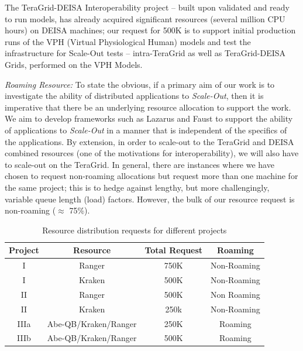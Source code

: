 \documentclass[a4paper,10pt]{article}
\begin{document}
The TeraGrid-DEISA Interoperability project -- built upon validated and ready to run models, has already acquired significant resources (several million CPU hours) on DEISA machines; our request for 500K is to support initial production runs of the VPH (Virtual Physiological Human) models and test the infrastructure for Scale-Out tests -- intra-TeraGrid as well as TeraGrid-DEISA Grids, performed on the VPH Models.

{\it Roaming Resource:} To state the obvious, if a primary aim of our work is to investigate the ability of distributed applications to {\it Scale-Out}, then it is imperative that there be an underlying resource allocation to support the work. We aim to develop frameworks such as Lazarus and Faust to support the ability of applications to {\it Scale-Out} in a manner that is independent of the specifics of the applications.  By extension, in order to scale-out to the TeraGrid and DEISA combined resources (one of the motivations for interoperability), we will also have to scale-out on the TeraGrid.  In general, there are instances where we have chosen to request non-roaming allocations but request more than one machine for the same project; this is to hedge against lengthy, but more challengingly, variable queue length (load) factors. However, 
the bulk of our resource request is non-roaming ($\approx$ 75\%).

\begin{table}[!h]
\begin{center}
  \caption{Resource distribution requests for different projects\newline}
\label{table:systems}
\begin{tabular}{|c| c | c | c | }
\hline 
Project & Resource & Total Request & Roaming \\
\hline
I & Ranger  & 750K & Non-Roaming \\
I & Kraken &  500K  & Non-Roaming \\
\hline
II & Ranger & 500K & Non Roaming \\
II & Kraken & 250k & Non-Roaming \\
\hline
IIIa & Abe-QB/Kraken/Ranger & 250K & Roaming \\
IIIb & Abe-QB/Kraken/Ranger & 500K & Roaming \\
\hline
\end{tabular}
\end{center}
\end{table}

\end{document}
